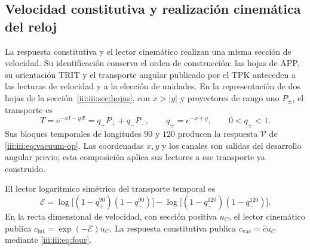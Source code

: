 \subsection{Velocidad constitutiva y realización cinemática del reloj}
\label{iii:iii:sec:enlace-velocidad-constitutiva}

La respuesta constitutiva y el lector cinemático realizan una misma
sección de velocidad. Su identificación conserva el orden de construcción:
las hojas de APP, su orientación TRIT y el transporte angular publicado
por el TPK anteceden a las lecturas de velocidad y a la elección de unidades.
En la representación de dos hojas de la
sección~\ref{iii:iii:sec:hojas}, con $x>|y|$ y proyectores de rango uno
$P_\pm$, el transporte es
\[
 T=e^{-xI-y\mathcal R}=q_+P_++q_-P_-,
 \qquad q_\pm=e^{-x\mp y},\qquad 0<q_\pm<1.
\]
Sus bloques temporales de longitudes $90$ y $120$ producen la respuesta
$\mathcal V$ de \eqref{iii:iii:eq:vacuum-op}. Las coordenadas $x,y$ y los
canales son salidas del desarrollo angular previo; esta composición
aplica sus lectores a ese transporte ya construido.

El lector logarítmico simétrico del transporte temporal es
\begin{equation}
 \mathcal E=
 \log\!\bigl[(1-q_+^{90})(1-q_-^{90})\bigr]
 -\log\!\bigl[(1-q_+^{120})(1-q_-^{120})\bigr].
 \label{iii:iii:eq:velocidad-lector-simetrico}
\end{equation}
En la recta dimensional de velocidad, con sección positiva $u_C$, el
lector cinemático publica $c_{\mathrm{int}}=\exp(-\mathcal E)u_C$.
La respuesta constitutiva publica
$c_{\mathrm{vac}}=\widehat c u_C$ mediante \eqref{iii:iii:eq:four}.

